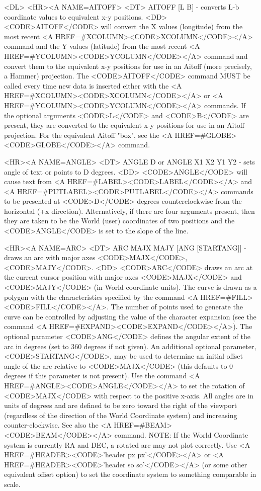\begin{rawhtml}

<DL>
<HR><A NAME=AITOFF>
<DT>
AITOFF [L B] - converts L-b coordinate values to equivalent x-y positions.
<DD>
	<CODE>AITOFF</CODE> will convert the X values (longitude) from
	the most recent <A HREF=#XCOLUMN><CODE>XCOLUMN</CODE></A>
	command and the Y values (latitude) from the most recent
	<A HREF=#YCOLUMN><CODE>YCOLUMN</CODE></A> command and convert them
	to the equivalent x-y positions for use in an Aitoff (more
	precisely, a Hammer) projection.  The <CODE>AITOFF</CODE>
	command MUST be called every time new data is inserted either
	with the <A HREF=#XCOLUMN><CODE>XCOLUMN</CODE></A> or
	<A HREF=#YCOLUMN><CODE>YCOLUMN</CODE></A> commands.  If the
	optional arguments <CODE>L</CODE> and <CODE>B</CODE> are present,
	they are converted to the equivalent x-y positions for use in
	an Aitoff projection.  For the equivalent Aitoff "box", see the
	<A HREF=#GLOBE><CODE>GLOBE</CODE></A> command.

<HR><A NAME=ANGLE>
<DT>
ANGLE D or ANGLE X1 X2 Y1 Y2 - sets angle of text or points to D degrees.
<DD>
	<CODE>ANGLE</CODE> will cause text from
	<A HREF=#LABEL><CODE>LABEL</CODE></A> and
	<A HREF=#PUTLABEL><CODE>PUTLABEL</CODE></A> commands to be
	presented at <CODE>D</CODE> degrees counterclockwise from the
	horizontal (+x direction).  Alternatively, if there are four
	arguments present, then they are taken to be the World (user)
	coordinates of two positions and the <CODE>ANGLE</CODE> is set
	to the slope of the line.

<HR><A NAME=ARC>
<DT>
ARC MAJX MAJY [ANG [STARTANG]] - draws an arc with major axes <CODE>MAJX</CODE>, <CODE>MAJY</CODE>.
<DD>
	<CODE>ARC</CODE> draws an arc at the current cursor position
	with major axes <CODE>MAJX</CODE> and <CODE>MAJY</CODE> (in World
	coordinate units).  The curve is drawn as a polygon with the
	characteristics specified by the command
	<A HREF=#FILL><CODE>FILL</CODE></A>.  The number of points used to
	generate the curve can be controlled by adjusting the value of
	the character expansion
	(see the command <A HREF=#EXPAND><CODE>EXPAND</CODE></A>).
	The optional parameter <CODE>ANG</CODE> defines the angular extent
	of the arc in degrees (set to 360 degrees if not given).
	An additional optional parameter, <CODE>STARTANG</CODE>,
	may be used to determine an initial offset angle of the arc relative to
	<CODE>MAJX</CODE> (this defaults to 0 degrees if this parameter is
	not present).  Use the command <A HREF=#ANGLE><CODE>ANGLE</CODE></A>
	to set the rotation of <CODE>MAJX</CODE> with respect to the
	positive x-axis.  All angles are in units of degrees and are
	defined to be zero toward the right of the viewport
	(regardless of the direction of the World Coordinate system)
	and increasing counter-clockwise.
	See also the <A HREF=#BEAM><CODE>BEAM</CODE></A> command.
	NOTE: If the World Coordinate system
	is currently RA and DEC, a rotated arc may not plot correctly.
	Use <A HREF=#HEADER><CODE>'header px px'</CODE></A> or
	<A HREF=#HEADER><CODE>'header so so'</CODE></A>
	(or some other equivalent offset option) to set the coordinate
	system to something comparable in scale.


\end{rawhtml}
